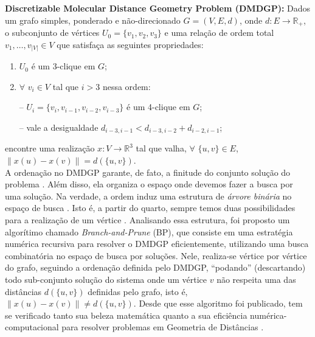 \documentclass[a4,11pt]{pssbmac}
\begin{document}
	\textbf{Discretizable Molecular Distance Geometry Problem (DMDGP): }Dados um grafo simples, ponderado e não-direcionado $G = (V,E,d)$, onde $d: E \rightarrow \mathbb{R}_{+}$, o subconjunto de vértices $U_{0} = \{v_{1},v_{2},v_{3} \}$ e uma relação de ordem total $v_1, \dots, v_{|V|} \in V$ que satisfaça as seguintes propriedades:
	\begin{enumerate}
		\item $U_{0}$ é um 3-clique em $G$;
		\vspace{-0.6cm}
		\item 
		\begin{minipage}{0.4\linewidth}  
			$\forall$ $v_{i} \in V$ tal que $i > 3$ nessa ordem:
		\end{minipage}
		\begin{minipage}{0.6\linewidth}
			\vspace{0.6cm}
			-- $U_{i} = \{v_i, v_{i-1}, v_{i-2}, v_{i-3}\}$ é um 4-clique em $G$; 
			\vspace{0.2cm}
						
			-- vale a desigualdade $d_{i-3,i-1} < d_{i-3,i-2} + d_{i-2,i-1}$;
		\end{minipage}
		
	\end{enumerate}
	encontre uma realização $x: V \rightarrow \mathbb{R}^{3}$ tal que valha, $\forall$ $\{u,v\} \in E$, $\left\| x(u) - x(v) \right\| = d(\{u,v\})$.
	\\
	
	A ordenação no DMDGP garante, de fato, a finitude do conjunto solução do problema \cite{carlileBook31Coloquio}. Além disso, ela organiza o espaço onde devemos fazer a busca por uma solução. Na verdade, a ordem induz uma estrutura de \textit{árvore binária} no espaço de busca \cite{fidalgotese}. Isto é, a partir do quarto, sempre temos duas possibilidades para a realização de um vértice \cite{carlileDMDGP}. Analisando essa estrutura, foi proposto um algorítimo chamado \textit{Branch-and-Prune} (BP), que consiste em uma estratégia numérica recursiva para resolver o DMDGP eficientemente, utilizando uma busca combinatória no espaço de busca por soluções. Nele, realiza-se vértice por vértice do grafo, seguindo a ordenação definida pelo DMDGP, ``podando'' (descartando) todo sub-conjunto solução do sistema onde um vértice $v$ não respeita uma das distâncias $d(\{u,v\})$ definidas pelo grafo, isto é, $\left\| x(u) - x(v) \right\| \neq d(\{u,v\})$. Desde que esse algoritmo foi publicado, tem se verificado tanto sua beleza matemática quanto a sua eficiência numérica-computacional para resolver problemas em Geometria de Distâncias \cite{fidalgotese}. 
	
\end{document}
